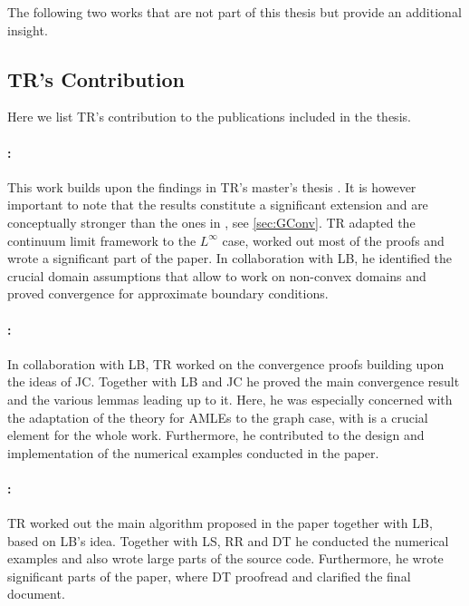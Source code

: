 \printbibliography[keyword={papersA}, resetnumbers=true, heading=none]
\printbibliography[keyword={papersB}, resetnumbers=true, heading=none]

\noindent%
The following two works that are not part of this thesis but provide an additional insight.

\printbibliography[keyword={papersC}, resetnumbers=true, heading=none]

\subsection*{TR's Contribution}

Here we list TR's contribution to the publications included in the thesis.

\paragraph{\cite{roith2022continuum}:} This work builds upon the findings in TR's master's thesis \cite{roith2022msc}. It is however important to note that the results constitute a significant extension and are conceptually stronger than the ones in \cite{roith2022msc}, see \cref{sec:GConv}. TR adapted the continuum limit framework to the $L^\infty$ case, worked out most of the proofs and wrote a significant part of the paper. In collaboration with LB, he identified the crucial domain assumptions that allow to work on non-convex domains and proved convergence for approximate boundary conditions.

\paragraph{\cite{bungert2021uniform}:} In collaboration with LB, TR worked on the convergence proofs building upon the ideas of JC. Together with LB and JC he proved the main convergence result and the various lemmas leading up to it. Here, he was especially concerned with the adaptation of the theory for AMLEs to the graph case, with is a crucial element for the whole work. Furthermore, he contributed to the design and implementation of the numerical examples conducted in the paper. 

\paragraph{\cite{bungert2021clip}:} TR worked out the main algorithm proposed in the paper together with LB, based on LB's idea. Together with LS, RR and DT he conducted the numerical examples and also wrote large parts of the source code. Furthermore, he wrote significant parts of the paper, where DT proofread and clarified the final document.

